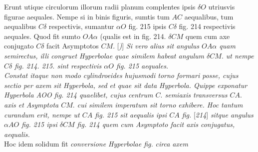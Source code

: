 {{Erunt utique circulorum illorum radii planum complentes ipsis $\displaystyle \delta O$ utriusvis figurae aequales.
Nempe si in binis figuris, sumtis tum $\displaystyle AC$ aequalibus,
tum aequalibus $\displaystyle C\delta$ respectivis, sumantur $\displaystyle \alpha O$
fig. 215 ipsis $\displaystyle C\delta$ fig. 214 respectivis aequales.
Quod fit sumto $\displaystyle OA\alpha$
(qualis est in fig. 214. $\displaystyle \delta CM$
quem cum axe conjugato $\displaystyle C\delta$ facit Asymptotos $\displaystyle CM.$}%
[\textit{)}]
\textit{Si vero alius sit angulus $\displaystyle OA\alpha$ quam semirectus,
illi congruet Hyperbolae quae similem habeat angulum $\displaystyle \delta CM.$
ut nempe $\displaystyle C\delta$ fig. 214. 215. sint respectivis $\displaystyle \alpha O$ fig. 215 aequales.\\
\hspace*{7,5mm}%
Constat itaque non modo cylindroeides hujusmodi torno formari posse,
cujus sectio per axem sit Hyperbola,
sed et quae sit data Hyperbola.
Quippe exponatur Hyperbola AOO fig. 214 quaelibet,
cujus centrum $\displaystyle C.$ semiaxis transversus $\displaystyle CA.$ axis
et Asymptota $\displaystyle CM.$
cui similem imperatum sit torno exhibere.
Hoc tantum curandum erit,
nempe ut $\displaystyle CA$ fig. 215 sit aequalis ipsi $\displaystyle CA$
fig.} [\textit{214}]
\textit{sitque angulus $\displaystyle \alpha AO$ fig. 215 ipsi $\displaystyle \delta CM$ fig. 214
quem cum Asymptoto facit axis conjugatus, aequalis.}\\
\hspace*{7,5mm}%
Hoc idem solidum fit
\textit{conversione Hyperbolae
fig.}
\textit{circa axem}
}{%
%
}
